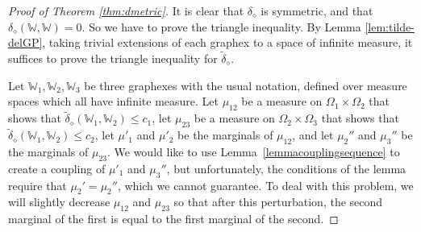 \documentclass{amsart}
\numberwithin{equation}{section}
\numberwithin{figure}{section}
\theoremstyle{definition}
\theoremstyle{remark}
\newcommand{\cW}{\mathbb{W}}
\def\delGP{\delta_\diamond}
\def\tdelGP{\widetilde\delta_\diamond}
\begin{document}
\begin{proof}[Proof of Theorem \ref{thm:dmetric}]
It is clear that $\delGP$ is symmetric, and that $\delGP(\cW,\cW)=0$. So we
have to prove the triangle inequality. By Lemma \ref{lem:tilde-delGP}, taking
trivial extensions of each graphex to a space of infinite measure, it
suffices to prove the triangle inequality for $\tdelGP$.

Let $\cW_1,\cW_2,\cW_3$ be three graphexes with the usual notation, defined
over measure spaces which all have infinite measure. Let $\mu_{12}$ be a
measure on $\Omega_1 \times \Omega_2$ that shows that
$\tdelGP(\cW_1,\cW_2)\leq c_1$, let $\mu_{23}$ be a measure on $\Omega_2
\times \Omega_3$ that shows that $\tdelGP(\cW_1,\cW_2)\leq c_2$, let $\mu'_1$
and $\mu'_2$ be the marginals of $\mu_{12}$, and let $\mu_2''$ and $\mu_3''$
be the marginals of $\mu_{23}$. We would like to use
Lemma~\ref{lemmacouplingsequence} to create a coupling of $\mu'_1$ and
$\mu_3''$, but unfortunately, the conditions of the lemma require that
$\mu_2'=\mu_2''$, which we cannot guarantee. To deal with this problem, we
will slightly decrease $\mu_{12}$ and $\mu_{23}$ so that after this
perturbation, the second marginal of the first is equal to the first marginal
of the second.


\end{proof}
\end{document}
